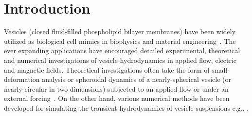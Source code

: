 \documentclass[prf,superscriptaddress,showpacs]{revtex4-1}
\begin{document}
\maketitle



\section{Introduction}
Vesicles (closed fluid-filled phospholipid bilayer membranes) have been
widely utilized as biological cell mimics in biophysics and material
engineering~\cite{sackmann1996, Barthes-Biesel2016_ARFM}.  The ever
expanding applications have encouraged detailed experimental,
theoretical and numerical investigations of vesicle hydrodynamics in
applied flow, electric and magnetic fields.  Theoretical
investigations often take the form of small-deformation analysis or
spheroidal dynamics of a nearly-spherical vesicle (or nearly-circular in
two dimensions) subjected to an applied flow or under an external
forcing~\cite{Barthes-BieselRallison1981_JFM, Misbah2006_PRL,
Vlahovska2007_PRE, Finken2008_EPL, ZhangZahnTanLin2013_PoF,
Nganguia2013_PRE}.  On the other hand, various numerical methods have
been developed for simulating the transient hydrodynamics of vesicle
suspensions e.g., \cite{BagchiJohoson2005_JBE, Biben2005_EJP,
Veerapaneni2009_JCP, SeolHuKimLai2016_JCP}.  
\end{document}
